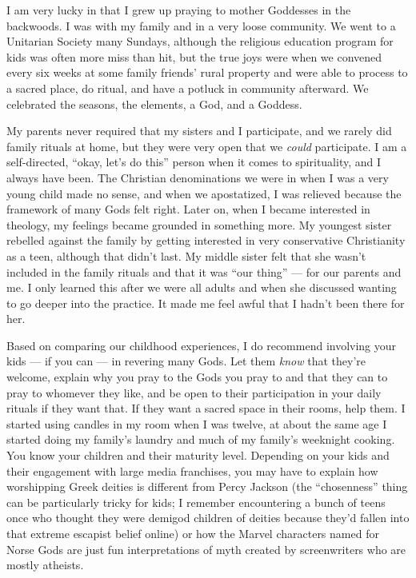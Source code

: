 \documentclass[
]{book}
\begin{document}
I am very lucky in that I grew up praying to mother Goddesses in the backwoods. I was with my family and in a very loose community. We went to a Unitarian Society many Sundays, although the religious education program for kids was often more miss than hit, but the true joys were when we convened every six weeks at some family friends' rural property and were able to process to a sacred place, do ritual, and have a potluck in community afterward. We celebrated the seasons, the elements, a God, and a Goddess.

My parents never required that my sisters and I participate, and we rarely did family rituals at home, but they were very open that we \emph{could} participate. I am a self-directed, ``okay, let's do this'' person when it comes to spirituality, and I always have been. The Christian denominations we were in when I was a very young child made no sense, and when we apostatized, I was relieved because the framework of many Gods felt right. Later on, when I became interested in theology, my feelings became grounded in something more. My youngest sister rebelled against the family by getting interested in very conservative Christianity as a teen, although that didn't last. My middle sister felt that she wasn't included in the family rituals and that it was ``our thing'' --- for our parents and me. I only learned this after we were all adults and when she discussed wanting to go deeper into the practice. It made me feel awful that I hadn't been there for her.

Based on comparing our childhood experiences, I do recommend involving your kids --- if you can --- in revering many Gods. Let them \emph{know} that they're welcome, explain why you pray to the Gods you pray to and that they can to pray to whomever they like, and be open to their participation in your daily rituals if they want that. If they want a sacred space in their rooms, help them. I started using candles in my room when I was twelve, at about the same age I started doing my family's laundry and much of my family's weeknight cooking. You know your children and their maturity level. Depending on your kids and their engagement with large media franchises, you may have to explain how worshipping Greek deities is different from Percy Jackson (the ``chosenness'' thing can be particularly tricky for kids; I remember encountering a bunch of teens once who thought they were demigod children of deities because they'd fallen into that extreme escapist belief online) or how the Marvel characters named for Norse Gods are just fun interpretations of myth created by screenwriters who are mostly atheists.
\end{document}

